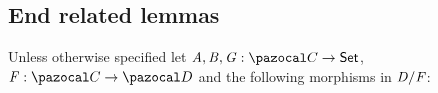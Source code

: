 


\subsection{End related lemmas}
\label{adx:end-lemmas}

Unless otherwise specified let $\vA,\vB,\vG : \mcatC \to \setC$, $\vF : \mcatC \to \mcatD$  and the following morphisms in ${\mathit{D}}/{\mathit{F}}$:
\begin{center}
\end{center}

